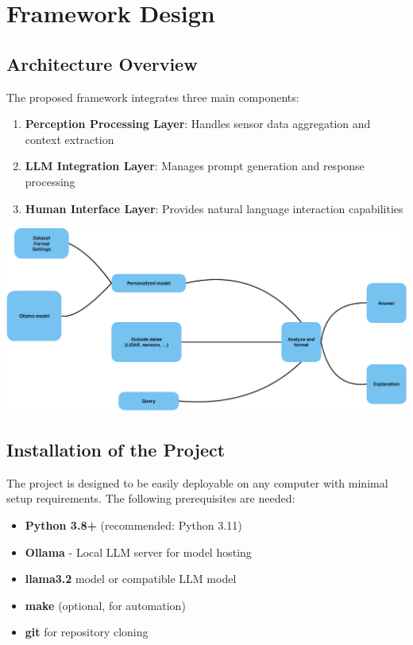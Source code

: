 \section{Framework Design}

\subsection{Architecture Overview}

The proposed framework integrates three main components:
\begin{enumerate}
    \item \textbf{Perception Processing Layer}: Handles sensor data aggregation and context extraction
    \item \textbf{LLM Integration Layer}: Manages prompt generation and response processing
    \item \textbf{Human Interface Layer}: Provides natural language interaction capabilities
\end{enumerate}

\begin{center}
    \includegraphics[scale=0.45]{figures/Model-HCI.png}
\end{center}

\subsection{Installation of the Project}

The project is designed to be easily deployable on any computer with minimal setup requirements. The following prerequisites are needed:

\begin{itemize}
    \item \textbf{Python 3.8+} (recommended: Python 3.11)
    \item \textbf{Ollama} - Local LLM server for model hosting
    \item \textbf{llama3.2} model or compatible LLM model
    \item \textbf{make} (optional, for automation)
    \item \textbf{git} for repository cloning
\end{itemize}

